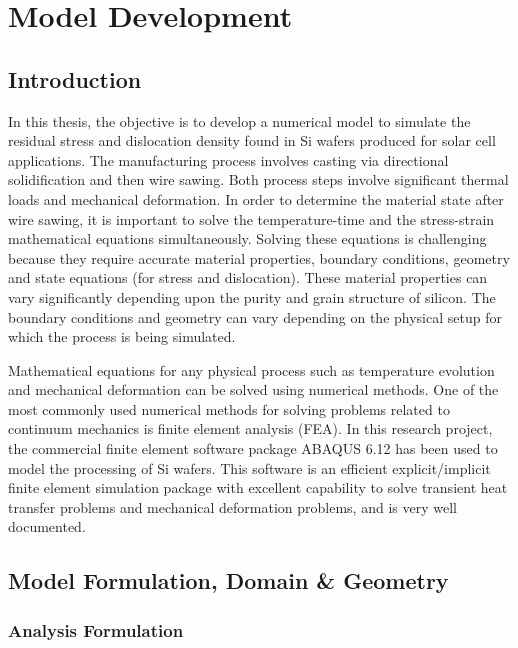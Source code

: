\chapter{Model Development}
\section{Introduction}
In this thesis, the objective is to develop a numerical model to simulate the residual stress and  dislocation density found in Si wafers produced for solar cell applications. The manufacturing process involves casting via directional solidification and then wire sawing. Both process steps involve significant thermal loads and mechanical deformation. In order to determine the material state after wire sawing, it is important to solve the temperature-time and the stress-strain mathematical equations simultaneously. Solving these equations is challenging because they require accurate material properties, boundary conditions, geometry and state equations (for stress and dislocation). These material properties can vary significantly depending upon the purity and grain structure of silicon. The boundary conditions and geometry can vary depending on the physical setup for which the process is being simulated. 

Mathematical equations for any physical process such as temperature evolution and mechanical deformation can be solved using numerical methods. One of the most commonly used numerical methods for solving problems related to continuum mechanics is finite element analysis (FEA). In this research project, the commercial finite element software package ABAQUS 6.12 has been used to model the processing of Si wafers. This software is an efficient explicit/implicit finite element simulation package with excellent capability to solve transient heat transfer problems and mechanical deformation problems, and is very well documented. 

\section{Model Formulation, Domain \& Geometry}


\subsection{Analysis Formulation}

